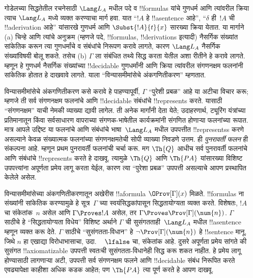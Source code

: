 \documentclass[../../../include/open-logic-section]{subfiles}
\begin{document}
गोडेलच्या सिद्धतेतील रचनेसाठी $\Lang L_A$ मधील पदे व
!!{formula}s यांचे गुणधर्म आणि त्यांवरील क्रिया त्याच $\Lang L_A$
मध्ये व्यक्त करण्याचा मार्ग हवा. यात ``$!A$ हे !!a{sentence} आहे'',
``$\delta$ ही~$!A$ ची !!a{derivation} आहे'' यांसारखे गुणधर्म
आणि $\Subst{!A}{t}{x}$ सारख्या क्रिया येतात. या मार्गाने
(a) चिन्हे आणि त्यांचे अनुक्रम (म्हणजे पदे, !!{formula}s,
!!{derivation}s इत्यादी) नैसर्गिक संख्यांत सांकेतिक करून
त्या गुणधर्मांचे व संबंधांचे निरूपण करावे लागते, कारण $\Lang L_A$
नैसर्गिक संख्यांविषयी बोलू शकते. तसेच (b) $\Gamma$ ला संबंधित
तथ्ये सिद्ध करता येतील अशा रीतीने हे करावे लागते. म्हणून हे
गुणधर्म नैसर्गिक संख्यांच्या !!{decidable} गुणधर्मांनी आणि क्रिया
त्यांवरील संगणनक्षम फलनांनी सांकेतिक होतात हे दाखवावे लागते.
याला ``विन्यासमीमांसेचे अंकगणितीकरण'' म्हणतात.

विन्यासमीमांसेचे अंकगणितीकरण कसे करावे हे पाहण्यापूर्वी, $\Gamma$
``पुरेशी प्रबळ'' आहे या अटीचा विचार करू; म्हणजे ती सर्व संगणनक्षम
फलनांचे आणि !!{decidable} संबंधांचे !!{represents} करते. यासाठी
``संगणनक्षम'' याची नेमकी व्याख्या द्यावी लागेल. ती अनेक मार्गांनी
देता येते; उदाहरणार्थ, ट्यूरिंग यंत्रांच्या प्रतिमानातून किंवा
सर्वसाधारण वापराच्या संगणक-भाषेतील कार्यक्रमांनी संगणित होणाऱ्या
फलनांच्या रूपात. मात्र आपले उद्दिष्ट या फलनांचे आणि संबंधांचे
भाषा~$\Lang L_A$ मधील उपपत्तीत !!{represents}s करणे असल्याने
केवळ संख्यात्मक फलनांच्या संगणनक्षमतेची सोपी व्याख्या निवडणे
उत्तम. ही \emph{पुनरावर्ती फलन} ही संकल्पना आहे. म्हणून प्रथम
पुनरावर्ती फलनांची चर्चा करू. मग $\Th{Q}$ आधीच सर्व पुनरावर्ती
फलनांचे आणि संबंधांचे !!{represents} करते हे दाखवू. त्यामुळे $\Th{Q}$
आणि $\Th{PA}$ यांसारख्या विशिष्ट उपपत्त्यांना अपूर्णता प्रमेय
लागू करता येईल, कारण त्या ``पुरेशा प्रबळ'' उपपत्ती असल्याचे
आपण प्रस्थापित केलेले असेल.

विन्यासमीमांसेच्या अंकगणितीकरणातून अखेरीस !!a{formula}
$\OProv[\Gamma](x)$ मिळते. !!{formula}s ना संख्यांनी सांकेतिक
करण्यामुळे हे सूत्र~$\Gamma$ च्या स्वयंसिद्धकांपासून सिद्धतायोग्यता
व्यक्त करते. विशेषतः, $!A$ चा संकेतांक~$n$ असेल आणि $\Gamma \Proves
!A$ असेल, तर $\Gamma \Proves \Prov[\Gamma](\num{n})$.
$\Gamma$ साठीचे हे ``सिद्धतायोग्यता विधेय'' विशिष्ट अर्थाने
$\Gamma$ ची सुसंगतताही~$\Lang L_A$ मधील !!a{sentence} म्हणून
व्यक्त करू देते. $\Gamma$ साठीचे ``सुसंगतता-विधान'' हे
$\lnot \Prov[\Gamma](\num{n})$ हे !!{sentence} मानू, जिथे $n$ हा
एखाद्या विरोधाभासाचा, उदा. ~ $\lfalse$ चा, संकेतांक आहे.
दुसरे अपूर्णता प्रमेय सांगते की सुसंगत !!{axiomatizable} उपपत्ती
स्वतःची सुसंगतता-विधानेही सिद्ध करू शकत नाहीत. हे प्रमेय लागू
होण्यासाठी लागणाऱ्या अटी, उपपत्ती सर्व संगणनक्षम फलने आणि
!!{decidable} संबंध निरूपित करते एवढ्यापेक्षा काहीशा अधिक
कडक आहेत; पण $\Th{PA}$ त्या पूर्ण करते हे आपण दाखवू.
\end{document}
